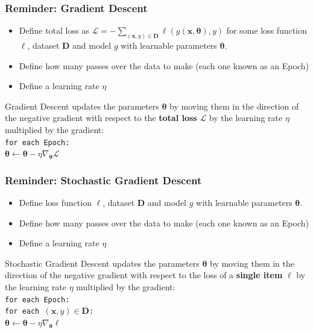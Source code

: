 \documentclass[\beamerclass]{beamer}
\begin{document}
\begin{frame}[fragile]\frametitle{Reminder: Gradient Descent}

\begin{itemize}
  \item Define total loss as $\mathcal{L} = -\sum_{(\bm x,y) \in \bm D} \ell(g(\bm x,\bm\theta), y)$ for some loss function $\ell$, dataset $\bm D$ and model $g$ with learnable parameters $\bm\theta$.
  \item Define how many passes over the data to make (each one known as an Epoch)
  \item Define a learning rate $\eta$
\end{itemize}

Gradient Descent updates the parameters $\bm\theta$ by moving them in the direction of the negative gradient with respect to the \textbf{total loss} $\mathcal{L}$ by the learning rate $\eta$ multiplied by the gradient:
\\[1em]
\hspace{1cm} \texttt{for each Epoch:}\\
\hspace{2cm} $\bm\theta \leftarrow \bm\theta - \eta \nabla_{\bm\theta} \mathcal{L}$
\end{frame}

\begin{frame}[fragile]\frametitle{Reminder: Stochastic Gradient Descent}

\begin{itemize}
  \item Define loss function $\ell$, dataset $\bm D$ and model $g$ with learnable parameters $\bm\theta$.
  \item Define how many passes over the data to make (each one known as an Epoch)
  \item Define a learning rate $\eta$
\end{itemize}

Stochastic Gradient Descent updates the parameters $\bm\theta$ by moving them in the direction of the negative gradient with respect to the loss of a \textbf{single item} $\ell$ by the learning rate $\eta$ multiplied by the gradient:
\\[1em]
\hspace{1cm} \texttt{for each Epoch:}\\
  \hspace{2cm} \texttt{for each $(\bm x,y) \in \bm D$:}\\
    \hspace{3cm} $\bm\theta \leftarrow \bm\theta - \eta \nabla_{\bm\theta} \ell$
\end{frame}
\end{document}

